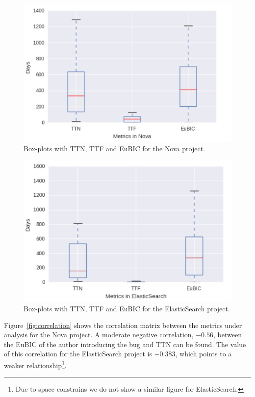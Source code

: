 \documentclass[10pt, conference]{IEEEtran}
\begin{document}
\begin{figure}[ht]
\centering
\includegraphics[width=\columnwidth]{boxplotNova.png}
\caption{Box-plots with TTN, TTF and EuBIC for the Nova project.}
\label{fig:meansOfNova}       %
\end{figure}

\begin{figure}[ht]
\centering
\includegraphics[width=\columnwidth]{boxplotES.png}
\caption{Box-plots with TTN, TTF and EuBIC for the ElasticSearch project.}
\label{fig:meansOfES}       %
\end{figure}

Figure~\ref{fig:correlation} shows the correlation matrix between the metrics under analysis for the Nova project. A moderate negative correlation, $-0.56$, between the EuBIC of the author introducing the bug and TTN can be found. The value of this correlation for the ElasticSearch project is $-0.383$, which points to a weaker relationship\footnote{Due to space constrains we do not show a similar figure for ElasticSearch.}.
\end{document}
